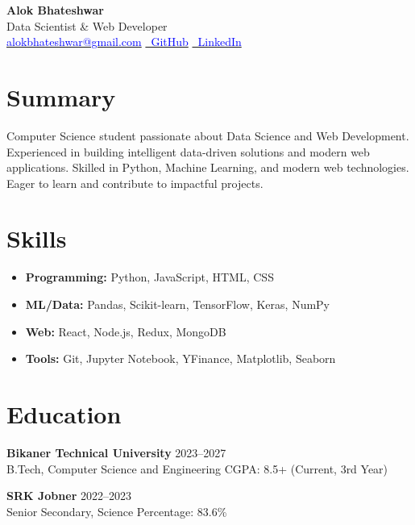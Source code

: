 \documentclass[11pt,a4paper]{article}
\begin{document}
\begin{center}
    {\LARGE \textbf{Alok Bhateshwar}} \\[2pt]
    Data Scientist \& Web Developer \\[2pt]
    \href{mailto:alokbhateshwar@gmail.com}{\textcolor{blue}{alokbhateshwar@gmail.com}} \quad
    \href{https://github.com/alokbhateshwar}{\textcolor{blue}{\faGithub\ GitHub}} \quad
    \href{https://www.linkedin.com/in/alok-bhateshwar-043202346}{\textcolor{blue}{\faLinkedin\ LinkedIn}}
\end{center}

\section*{Summary}
Computer Science student passionate about Data Science and Web Development. Experienced in building intelligent data-driven solutions and modern web applications. Skilled in Python, Machine Learning, and modern web technologies. Eager to learn and contribute to impactful projects.

\section*{Skills}
\begin{itemize}[leftmargin=*]
    \item \textbf{Programming:} Python, JavaScript, HTML, CSS
    \item \textbf{ML/Data:} Pandas, Scikit-learn, TensorFlow, Keras, NumPy
    \item \textbf{Web:} React, Node.js, Redux, MongoDB
    \item \textbf{Tools:} Git, Jupyter Notebook, YFinance, Matplotlib, Seaborn
\end{itemize}

\section*{Education}
\textbf{Bikaner Technical University} \hfill 2023--2027 \\
B.Tech, Computer Science and Engineering \hfill CGPA: 8.5+ (Current, 3rd Year)

\textbf{SRK Jobner} \hfill 2022--2023 \\
Senior Secondary, Science \hfill Percentage: 83.6\%
\end{document}
